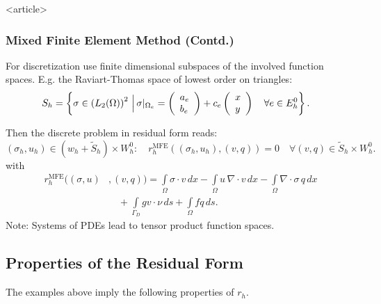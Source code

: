 \begin{frame}<article>
\frametitle<presentation>{Mixed Finite Element Method (Contd.)}
For discretization use finite dimensional subspaces
of the involved function spaces. 
E.g. the Raviart-Thomas space of lowest order on triangles:
\begin{align*}
S_h &= \left\{\sigma\in\left(L_2(\Omega) \right)^2  \,\Bigl|\, \sigma|_{\Omega_e} =
\left(\begin{array}{l} a_e\\ b_e \end{array}\right) + 
c_e \left(\begin{array}{l} x\\ y \end{array}\right) \quad\forall e\in E^0_h
\right\} .
\end{align*}

Then the discrete problem in residual form reads:
\begin{equation*}
(\sigma_h, u_h) \in (w_h+\tilde{S}_h)\times W_h^0 : \quad 
r_h^\text{MFE}\left((\sigma_h,u_h),(v,q)\right) = 0 \quad \forall
(v,q) \in \tilde{S}_h\times W_h^0 .
\end{equation*}
with
\begin{equation*}
\begin{split}
r_h^\text{MFE}((\sigma,u)&,(v,q)) = 
\int\limits_\Omega \sigma\cdot v \, dx  -\int\limits_\Omega
u \, \nabla\cdot v \, dx 
 - \int\limits_\Omega \nabla\cdot\sigma \, q \, dx\\ 
&\quad + \int\limits_{\Gamma_D} g v\cdot \nu \, ds + \int\limits_\Omega f q \,
ds .
\end{split}
\end{equation*}
Note: Systems of PDEs lead to tensor product function spaces.
\end{frame}

\subsection{Properties of the Residual Form}

The examples above imply the following properties of $r_h$.

